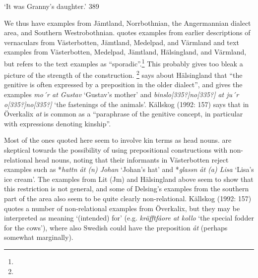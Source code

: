\begin{styleTranslation}
‘It was Granny’s daughter.’ 389

\end{styleTranslation}

\begin{styleBodyTextFirst}
We thus have examples from Jämtland, Norrbothnian, the Angermannian dialect area, and Southern Westrobothnian. \citet[44]{Delsing2003a} quotes examples from earlier descriptions of vernaculars from Västerbotten, Jämtland, Medelpad, and Värmland and text examples from Västerbotten, Medelpad, Jämtland, Hälsingland, and Värmland, but refers to the text examples as “sporadic”.\footnote{} This probably gives too bleak a picture of the strength of the construction. \citet[61]{Hedblom1978}\footnote{} says about Hälsingland that “the genitive is often expressed by a preposition in the older dialect”, and gives the examples \textit{mo´r at Gus{\textasciigrave}tav} ‘Gustav’s mother’ and \textit{bins{\textasciigrave}lo[335?]no[335?] at ju´r o[335?]no[335?] }‘the fastenings of the animals’. Källskog (1992: 157) says that in Överkalix \textit{at} is common as a “paraphrase of the genitive concept, in particular with expressions denoting kinship”. 

\end{styleBodyTextFirst}

\begin{styleBodytextC}
Most of the ones quoted here seem to involve kin terms as head nouns. \citet{BergholmEtAl1999} are skeptical towards the possibility of using prepositional constructions with non-relational head nouns, noting that their informants in Västerbotten reject examples such as *\textit{hattn åt (n) Johan} ‘Johan’s hat’ and *\textit{glassn åt (a) Lisa} ‘Lisa’s ice cream’. The examples from Lit (Jm) and Hälsingland above seem to show that this restriction is not general, and some of Delsing’s examples from the southern part of the area also seem to be quite clearly non-relational. Källskog (1992: 157) quotes a number of non-relational examples from Överkalix, but they may be interpreted as meaning ‘(intended) for’ (e.g. \textit{kräfftfåore at kollo} ‘the special fodder for the cows’), where also Swedish could have the preposition \textit{åt} (perhaps somewhat marginally). 

\end{styleBodytextC}

